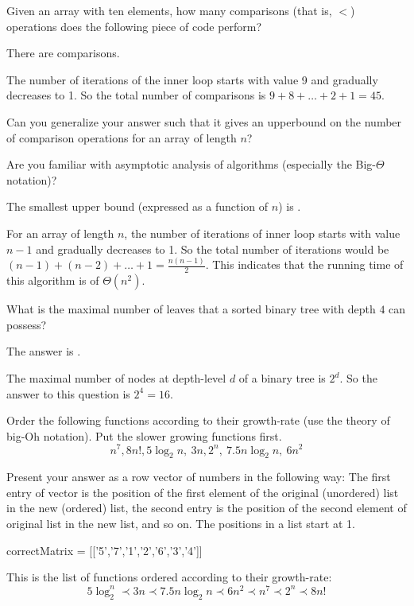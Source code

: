 \documentclass{ximera}
\begin{document}
\begin{question}
Given an array with ten elements, how many comparisons (that is, $<$)
operations does the following piece of code perform?
\begin{solution}
There are  comparisons.
\end{solution}  
The number of iterations of the inner loop starts with value 9 and
gradually decreases to 1. So the total number of comparisons is $ 9 +
8 + \ldots + 2 + 1 = 45$.

Can you generalize your answer such that it gives an upperbound on the
number of comparison operations for an array of length $n$?
\begin{solution}
\begin{hint}
Are you familiar with asymptotic analysis of algorithms (especially
the Big-$\Theta$ notation)?
\end{hint}
The smallest upper bound (expressed as a function of $n$) is
.
\end{solution}
For an array of length $n$, the number of iterations of inner loop
starts with value $n-1$ and gradually decreases to 1. So the total
number of iterations would be $(n-1) + (n-2) + \ldots + 1 =
\frac{n(n-1)}{2}$. This indicates that the running time of this
algorithm is of $\Theta(n^2)$.
\end{question}

\begin{question}
What is the maximal number of leaves that a sorted binary tree with depth $4$ can possess?
\begin{solution}
The answer is .
\end{solution}
The maximal number of nodes at depth-level $d$ of a binary tree is $2^d$. So the answer to this question is $2^4 = 16$. 
\end{question}

\begin{question}
Order the following functions according to their growth-rate (use the theory of big-Oh notation). Put the slower growing functions first.
\[
n^7, 8n!, 5 \log_2 n,~ 3n, 2^n, ~ 7.5 n\log_2 n, ~ 6 n^2
\]
\begin{solution}
Present your answer as a row vector of numbers in the following way: The first entry of vector is the position of the first element of the original (unordered) list in the new (ordered) list, the second entry is the position of the second element of original list in the new list, and so on. The positions in a list start at 1.

\begin{matrix-answer}[name=M]
     correctMatrix = [['5','7','1','2','6','3','4']]
\end{matrix-answer}
\end{solution}

This is the list of functions ordered according to their growth-rate:
\begin{equation*}
5 \log_2^n \prec 3n \prec 7.5 n \log_2{n} \prec 6n^2 \prec n^7 \prec 2^n \prec 8n!
\end{equation*}
\end{question}
\end{document}
